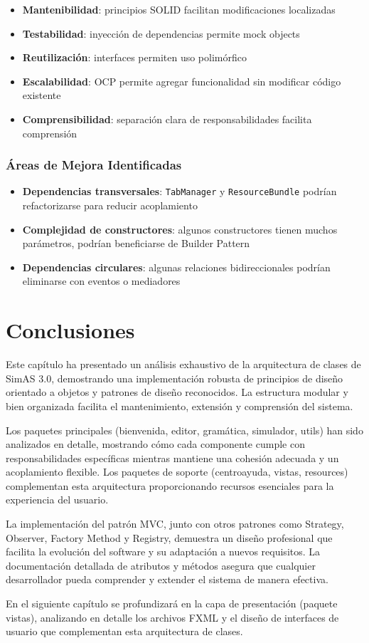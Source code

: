 \begin{itemize}
    \item \textbf{Mantenibilidad}: principios SOLID facilitan modificaciones localizadas
    \item \textbf{Testabilidad}: inyección de dependencias permite mock objects
    \item \textbf{Reutilización}: interfaces permiten uso polimórfico
    \item \textbf{Escalabilidad}: OCP permite agregar funcionalidad sin modificar código existente
    \item \textbf{Comprensibilidad}: separación clara de responsabilidades facilita comprensión
\end{itemize}

\subsubsection{Áreas de Mejora Identificadas}

\begin{itemize}
    \item \textbf{Dependencias transversales}: \texttt{TabManager} y \texttt{ResourceBundle} podrían refactorizarse para reducir acoplamiento
    \item \textbf{Complejidad de constructores}: algunos constructores tienen muchos parámetros, podrían beneficiarse de Builder Pattern
    \item \textbf{Dependencias circulares}: algunas relaciones bidireccionales podrían eliminarse con eventos o mediadores
\end{itemize}

\section{Conclusiones}

Este capítulo ha presentado un análisis exhaustivo de la arquitectura de clases de SimAS 3.0, demostrando una implementación robusta de principios de diseño orientado a objetos y patrones de diseño reconocidos. La estructura modular y bien organizada facilita el mantenimiento, extensión y comprensión del sistema.

Los paquetes principales (bienvenida, editor, gramática, simulador, utils) han sido analizados en detalle, mostrando cómo cada componente cumple con responsabilidades específicas mientras mantiene una cohesión adecuada y un acoplamiento flexible. Los paquetes de soporte (centroayuda, vistas, resources) complementan esta arquitectura proporcionando recursos esenciales para la experiencia del usuario.

La implementación del patrón MVC, junto con otros patrones como Strategy, Observer, Factory Method y Registry, demuestra un diseño profesional que facilita la evolución del software y su adaptación a nuevos requisitos. La documentación detallada de atributos y métodos asegura que cualquier desarrollador pueda comprender y extender el sistema de manera efectiva.

En el siguiente capítulo se profundizará en la capa de presentación (paquete vistas), analizando en detalle los archivos FXML y el diseño de interfaces de usuario que complementan esta arquitectura de clases.

